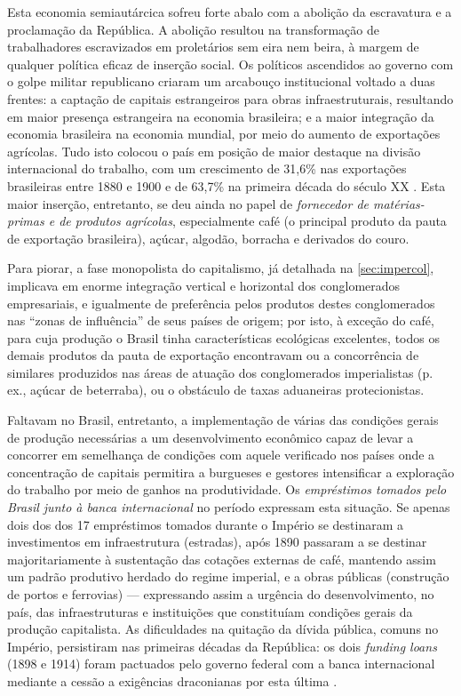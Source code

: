 Esta economia semiautárcica sofreu forte abalo com a abolição da escravatura e a proclamação da República. A abolição resultou na transformação de trabalhadores escravizados em proletários sem eira nem beira, à margem de qualquer política eficaz de inserção social. Os políticos ascendidos ao governo com o golpe militar republicano criaram um arcabouço institucional voltado a duas frentes: a captação de capitais estrangeiros para obras infraestruturais, resultando em maior presença estrangeira na economia brasileira; e a maior integração da economia brasileira na economia mundial, por meio do aumento de exportações agrícolas. Tudo isto colocou o país em posição de maior destaque na divisão internacional do trabalho, com um crescimento de 31,6\% nas exportações brasileiras entre 1880 e 1900 e de 63,7\% na primeira década do século XX \cite[p.~352]{singer_braecomu_1977}. Esta maior inserção, entretanto, se deu ainda no papel de \textit{fornecedor de matérias-primas e de produtos agrícolas}, especialmente café (o principal produto da pauta de exportação brasileira), açúcar, algodão, borracha e derivados do couro. 





Para piorar, a fase monopolista do capitalismo, já detalhada na \autoref{sec:impercol}, implicava em enorme integração vertical e horizontal dos conglomerados empresariais, e igualmente de preferência pelos produtos destes conglomerados nas ``zonas de influência'' de seus países de origem; por isto, à exceção do café, para cuja produção o Brasil tinha características ecológicas excelentes, todos os demais produtos da pauta de exportação encontravam ou a concorrência de similares produzidos nas áreas de atuação dos conglomerados imperialistas (p. ex., açúcar de beterraba), ou o obstáculo de taxas aduaneiras protecionistas. 

Faltavam no Brasil, entretanto, a implementação de várias das condições gerais de produção necessárias a um desenvolvimento econômico capaz de levar a concorrer em semelhança de condições com aquele verificado nos países onde a concentração de capitais permitira a burgueses e gestores intensificar a exploração do trabalho por meio de ganhos na produtividade. Os \textit{empréstimos tomados pelo Brasil junto à banca internacional} no período expressam esta situação. Se apenas dois dos dos 17 empréstimos tomados durante o Império se destinaram a investimentos em infraestrutura (estradas), após 1890 passaram a se destinar majoritariamente à sustentação das cotações externas de café, mantendo assim um padrão produtivo herdado do regime imperial, e a obras públicas (construção de portos e ferrovias) --- expressando assim a urgência do desenvolvimento, no país, das infraestruturas e instituições que constituíam condições gerais da produção capitalista. As dificuldades na quitação da dívida pública, comuns no Império, persistiram nas primeiras décadas da República: os dois \textit{funding loans} (1898 e 1914) foram pactuados pelo governo federal com a banca internacional mediante a cessão a exigências draconianas por esta última \cite[p.~365]{singer_braecomu_1977}.


